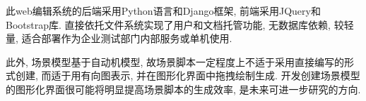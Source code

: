             此web编辑系统的后端采用Python语言和Django框架, 前端采用JQuery和Bootstrap库. 直接依托文件系统实现了用户和文档托管功能, 无数据库依赖, 较轻量, 适合部署作为企业测试部门内部服务或单机使用.
        
            \label{sec:scenario_gui_edit}
            此外, 场景模型基于自动机模型, 故场景脚本一定程度上不适于采用直接编写的形式创建, 而适于用有向图表示, 并在图形化界面中拖拽绘制生成\cite{junyiw17}. 开发创建场景模型的图形化界面很可能将明显提高场景脚本的生成效率, 是未来可进一步研究的方向.
            


